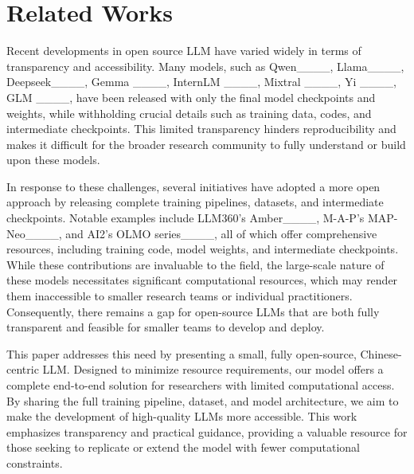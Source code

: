 \section{Related Works}
Recent developments in open source LLM have varied widely in terms of transparency and accessibility. Many models, such as Qwen____, Llama____, Deepseek____, Gemma ____, InternLM ____, Mixtral ____, Yi ____, GLM ____, have been released with only the final model checkpoints and weights, while withholding crucial details such as training data, codes, and intermediate checkpoints. This limited transparency hinders reproducibility and makes it difficult for the broader research community to fully understand or build upon these models.

In response to these challenges, several initiatives have adopted a more open approach by releasing complete training pipelines, datasets, and intermediate checkpoints. Notable examples include LLM360’s Amber____, M-A-P’s MAP-Neo____, and AI2’s OLMO series____, all of which offer comprehensive resources, including training code, model weights, and intermediate checkpoints. While these contributions are invaluable to the field, the large-scale nature of these models necessitates significant computational resources, which may render them inaccessible to smaller research teams or individual practitioners. Consequently, there remains a gap for open-source LLMs that are both fully transparent and feasible for smaller teams to develop and deploy.

This paper addresses this need by presenting a small, fully open-source, Chinese-centric LLM. Designed to minimize resource requirements, our model offers a complete end-to-end solution for researchers with limited computational access. By sharing the full training pipeline, dataset, and model architecture, we aim to make the development of high-quality LLMs more accessible. This work emphasizes transparency and practical guidance, providing a valuable resource for those seeking to replicate or extend the model with fewer computational constraints.